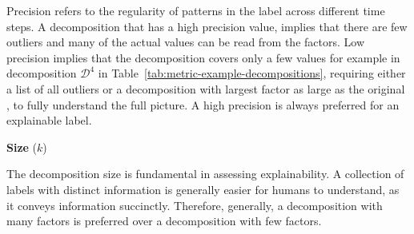 Precision refers to the regularity of patterns in the label across different time steps.
A decomposition that has a high precision value, implies that there are few outliers and many of the actual values can be read from the factors.
Low precision implies that the decomposition covers only a few values for example in decomposition $\mathcal{D}^4$ in Table~\ref{tab:metric-example-decompositions}, requiring either a list of all outliers or a decomposition with largest factor as large as the original \DFA, to fully understand the full picture.
A high precision is always preferred for an explainable label. 

\textbf{Size} ($k$)

The decomposition size is fundamental in assessing explainability.
A collection of labels with distinct information is generally easier for humans to understand, as it conveys information succinctly.
Therefore, generally, a decomposition with many factors is preferred over a decomposition with few factors.

